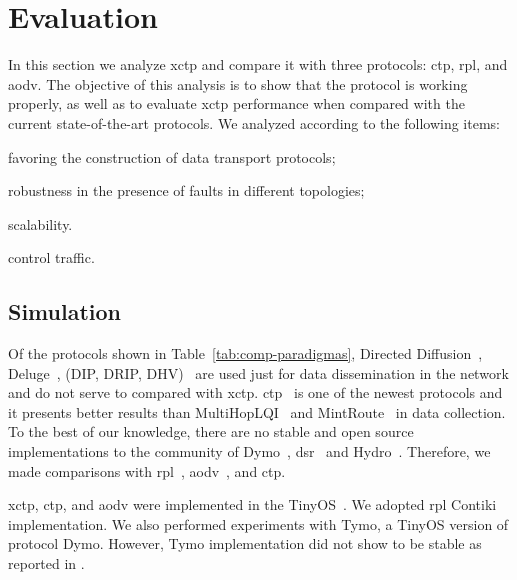 \section{Evaluation}
\label{sec:evaluation}



In this section we analyze \ac{xctp} and compare it with three protocols: \ac{ctp}, \ac{rpl}, and \ac{aodv}. The objective of this analysis is to show that the protocol is working properly, as well as to evaluate \ac{xctp} performance when compared with the current state-of-the-art protocols. We analyzed according to
the following items:
\begin{inparaenum}
    \item favoring the construction of data transport protocols;
    \item robustness in the presence of faults in different topologies;
    \item scalability.
    \item control traffic.
\end{inparaenum}

\subsection{Simulation}
\label{sec:simulation}

Of the protocols shown in Table~\ref{tab:comp-paradigmas}, Directed Diffusion~\cite{directedDiffusion}, Deluge~\cite{deluge}, (DIP, DRIP, DHV)~\cite{tinyos} are used just for data dissemination in the network and do not serve to compared with \ac{xctp}. \acf{ctp}~\cite{ctp} is one of the newest protocols and it presents better results than MultiHopLQI~\cite{MultiHopLQI} and MintRoute~\cite{mintroute} in data collection. To the best of our knowledge, there are no stable and open source implementations to the community of Dymo~\cite{dymo}, \ac{dsr}~\cite{DSR} and Hydro~\cite{hydro}. Therefore, we made comparisons with \ac{rpl}~\cite{RPL}, \ac{aodv}~\cite{AODV}, and \ac{ctp}.

\ac{xctp}, \ac{ctp}, and \ac{aodv} were implemented in the TinyOS~\cite{tinyos}. We adopted \ac{rpl}
Contiki~\cite{contiki} implementation. We also performed experiments with Tymo, a TinyOS version of protocol Dymo. However, Tymo implementation did not show to be stable as reported in \cite{tymo}.

